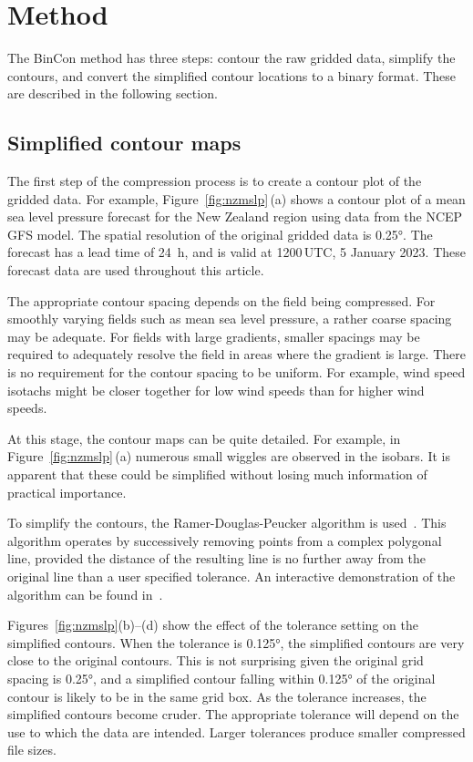 \documentclass[12pt,a4paper]{article}
\begin{document}
\section*{Method}
\label{sec:method}

The BinCon method has three steps: contour the raw gridded data, simplify the
contours, and convert the simplified contour locations to a binary format.
These are described in the following section.

\subsection*{Simplified contour maps}
\label{sec:contouring}

The first step of the compression process is to create a contour plot of the
gridded data. For example, Figure~\ref{fig:nzmslp}\,(a)
shows a contour plot of a mean sea level pressure forecast for the New Zealand
region using data from the NCEP GFS model. The spatial resolution of the
original gridded data is \ang{0.25}. The forecast has a lead time of
\SI{24}{\hour}, and is valid at 1200\,UTC, 5 January 2023. These forecast data are
used throughout this article.

The appropriate contour spacing depends on the field being compressed. For
smoothly varying fields such as mean sea level pressure, a rather coarse
spacing may be adequate. For fields with large gradients, smaller spacings may
be required to adequately resolve the field in areas where the gradient is
large. There is no requirement for the contour spacing to be uniform. For
example, wind speed isotachs might be closer together for low wind speeds than
for higher wind speeds.

At this stage, the contour maps can be quite detailed. For example, in
Figure~\ref{fig:nzmslp}\,(a) numerous small wiggles are observed in the
isobars. It is apparent that these could be simplified without losing much
information of practical importance.

To simplify the contours, the Ramer-Douglas-Peucker algorithm is
used~\citep{ramer1972, douglas_peucker1973}. This algorithm operates by
successively removing points from a complex polygonal line, provided the
distance of the resulting line is no further away from the original line than a
user specified tolerance. An interactive demonstration of the algorithm can be
found in~\citet{karthaus2012}.

Figures~\ref{fig:nzmslp}(b)--(d) show the effect of the tolerance setting on
the simplified contours. When the tolerance is \ang{0.125}, the simplified
contours are very close to the original contours. This is not surprising given
the original grid spacing is \ang{0.25}, and a simplified contour falling
within \ang{0.125} of the original contour is likely to be in the same grid
box. As the tolerance increases, the simplified contours become cruder. The
appropriate tolerance will depend on the use to which the data are intended.
Larger tolerances produce smaller compressed file sizes.
\end{document}
